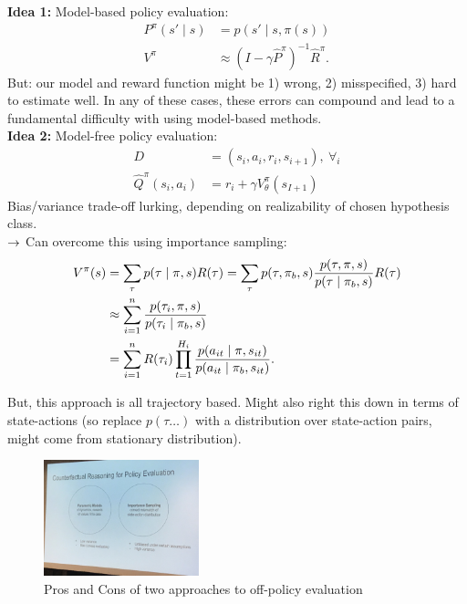{\bf Idea 1:} Model-based policy evaluation:
\begin{align}
P^\pi(s' \mid s) &= p(s' \mid s, \pi(s)) \\
V^\pi &\approx (I - \gamma \hat{P}^\pi)^{-1}\hat{R}^\pi.
\end{align}
But: our model and reward function might be 1) wrong, 2) misspecified, 3) hard to estimate well. In any of these cases, these errors can compound and lead to a fundamental difficulty with using model-based methods. \\

{\bf Idea 2:} Model-free policy evaluation:
\begin{align}
    D &= (s_i, a_i, r_i, s_{i+1}),\ \forall_i \\
    \hat{Q}^\pi(s_i,a_i) &= r_i + \gamma V_\theta^{\pi}(s_{I+1})
\end{align}
Bias/variance trade-off lurking, depending on realizability of chosen hypothesis class. \\

$\rightarrow$ Can overcome this using importance sampling:
\begin{align}
    V^{\pi}(s) &= \sum_\tau p(\tau \mid \pi, s) R(\tau) = \sum_\tau p(\tau, \pi_b, s) \frac{p(\tau, \pi, s)}{p(\tau \mid \pi_b, s)} R(\tau) \\
    &\approx \sum_{i = 1}^n \frac{p(\tau_i, \pi, s)}{p(\tau_i \mid \pi_b, s)} \\
    &= \sum_{i = 1}^n R(\tau_i) \prod_{t=1}^{H_i} \frac{p(a_{it} \mid \pi, s_{it})}{p(a_{it} \mid \pi_b, s_{it})}.
\end{align}

But, this approach is all trajectory based. Might also right this down in terms of state-actions (so replace $p(\tau \ldots)$ with a distribution over state-action pairs, might come from stationary distribution). \\

\begin{figure}[h!]
    \centering
    \includegraphics[width=0.4\textwidth]{images/pv.JPG}
    \caption{Pros and Cons of two approaches to off-policy evaluation}
    \label{fig:pv}
\end{figure}

